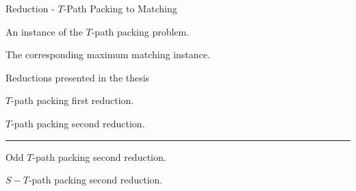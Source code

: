 \documentclass{beamer}
\begin{document}
\begin{frame}[t]{Reduction - $T$-Path Packing to Matching}
	\begin{minipage}[t][.4\textheight][t]{\linewidth}
		An instance of the $T$-path packing problem.
	\end{minipage}
	\hfill
	\begin{minipage}[t][.4\textheight][t]{\linewidth}
		The corresponding maximum matching instance.
	\end{minipage}
\end{frame}

\begin{frame}[t]{Reductions presented in the thesis}
	\begin{minipage}[t][.3\textheight][t]{\linewidth}
		\begin{minipage}[t][\textheight][t]{.45\linewidth}

			$T$-path packing first reduction.
			
		\end{minipage}
		\hfill
		\vline
		\hfill
		\begin{minipage}[t][\textheight][t]{.45\linewidth}
			$T$-path packing second reduction.
		\end{minipage}
	\end{minipage}
		\vfill
		\hrule
		\vfill
	\begin{minipage}[t][.3\textheight][t]{\linewidth}
		\begin{minipage}[t][\textheight][t]{.45\linewidth}
			Odd $T$-path packing second reduction.
		\end{minipage}
		\hfill
		\hfill
		\begin{minipage}[t][\textheight][t]{.45\linewidth}
			$S-T$-path packing second reduction.
		\end{minipage}
	\end{minipage}

\end{frame}
\end{document}
